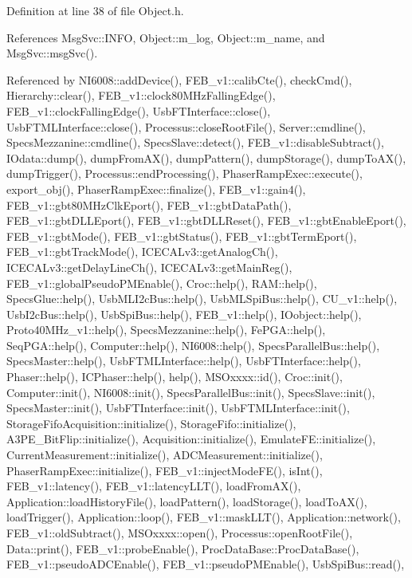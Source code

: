Definition at line 38 of file Object.\+h.



References Msg\+Svc\+::\+I\+N\+FO, Object\+::m\+\_\+log, Object\+::m\+\_\+name, and Msg\+Svc\+::msg\+Svc().



Referenced by N\+I6008\+::add\+Device(), F\+E\+B\+\_\+v1\+::calib\+Cte(), check\+Cmd(), Hierarchy\+::clear(), F\+E\+B\+\_\+v1\+::clock80\+M\+Hz\+Falling\+Edge(), F\+E\+B\+\_\+v1\+::clock\+Falling\+Edge(), Usb\+F\+T\+Interface\+::close(), Usb\+F\+T\+M\+L\+Interface\+::close(), Processus\+::close\+Root\+File(), Server\+::cmdline(), Specs\+Mezzanine\+::cmdline(), Specs\+Slave\+::detect(), F\+E\+B\+\_\+v1\+::disable\+Subtract(), I\+Odata\+::dump(), dump\+From\+A\+X(), dump\+Pattern(), dump\+Storage(), dump\+To\+A\+X(), dump\+Trigger(), Processus\+::end\+Processing(), Phaser\+Ramp\+Exec\+::execute(), export\+\_\+obj(), Phaser\+Ramp\+Exec\+::finalize(), F\+E\+B\+\_\+v1\+::gain4(), F\+E\+B\+\_\+v1\+::gbt80\+M\+Hz\+Clk\+Eport(), F\+E\+B\+\_\+v1\+::gbt\+Data\+Path(), F\+E\+B\+\_\+v1\+::gbt\+D\+L\+L\+Eport(), F\+E\+B\+\_\+v1\+::gbt\+D\+L\+L\+Reset(), F\+E\+B\+\_\+v1\+::gbt\+Enable\+Eport(), F\+E\+B\+\_\+v1\+::gbt\+Mode(), F\+E\+B\+\_\+v1\+::gbt\+Status(), F\+E\+B\+\_\+v1\+::gbt\+Term\+Eport(), F\+E\+B\+\_\+v1\+::gbt\+Track\+Mode(), I\+C\+E\+C\+A\+Lv3\+::get\+Analog\+Ch(), I\+C\+E\+C\+A\+Lv3\+::get\+Delay\+Line\+Ch(), I\+C\+E\+C\+A\+Lv3\+::get\+Main\+Reg(), F\+E\+B\+\_\+v1\+::global\+Pseudo\+P\+M\+Enable(), Croc\+::help(), R\+A\+M\+::help(), Specs\+Glue\+::help(), Usb\+M\+L\+I2c\+Bus\+::help(), Usb\+M\+L\+Spi\+Bus\+::help(), C\+U\+\_\+v1\+::help(), Usb\+I2c\+Bus\+::help(), Usb\+Spi\+Bus\+::help(), F\+E\+B\+\_\+v1\+::help(), I\+Oobject\+::help(), Proto40\+M\+Hz\+\_\+v1\+::help(), Specs\+Mezzanine\+::help(), Fe\+P\+G\+A\+::help(), Seq\+P\+G\+A\+::help(), Computer\+::help(), N\+I6008\+::help(), Specs\+Parallel\+Bus\+::help(), Specs\+Master\+::help(), Usb\+F\+T\+M\+L\+Interface\+::help(), Usb\+F\+T\+Interface\+::help(), Phaser\+::help(), I\+C\+Phaser\+::help(), help(), M\+S\+Oxxxx\+::id(), Croc\+::init(), Computer\+::init(), N\+I6008\+::init(), Specs\+Parallel\+Bus\+::init(), Specs\+Slave\+::init(), Specs\+Master\+::init(), Usb\+F\+T\+Interface\+::init(), Usb\+F\+T\+M\+L\+Interface\+::init(), Storage\+Fifo\+Acquisition\+::initialize(), Storage\+Fifo\+::initialize(), A3\+P\+E\+\_\+\+Bit\+Flip\+::initialize(), Acquisition\+::initialize(), Emulate\+F\+E\+::initialize(), Current\+Measurement\+::initialize(), A\+D\+C\+Measurement\+::initialize(), Phaser\+Ramp\+Exec\+::initialize(), F\+E\+B\+\_\+v1\+::inject\+Mode\+F\+E(), is\+Int(), F\+E\+B\+\_\+v1\+::latency(), F\+E\+B\+\_\+v1\+::latency\+L\+L\+T(), load\+From\+A\+X(), Application\+::load\+History\+File(), load\+Pattern(), load\+Storage(), load\+To\+A\+X(), load\+Trigger(), Application\+::loop(), F\+E\+B\+\_\+v1\+::mask\+L\+L\+T(), Application\+::network(), F\+E\+B\+\_\+v1\+::old\+Subtract(), M\+S\+Oxxxx\+::open(), Processus\+::open\+Root\+File(), Data\+::print(), F\+E\+B\+\_\+v1\+::probe\+Enable(), Proc\+Data\+Base\+::\+Proc\+Data\+Base(), F\+E\+B\+\_\+v1\+::pseudo\+A\+D\+C\+Enable(), F\+E\+B\+\_\+v1\+::pseudo\+P\+M\+Enable(), Usb\+Spi\+Bus\+::read(), 